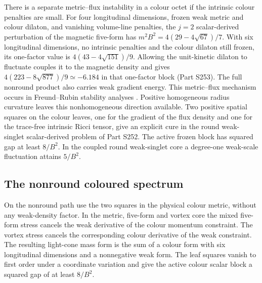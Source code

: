 \documentclass[aps,prd,reprint,onecolumn,nofootinbib,amsmath,amssymb]{revtex4-2}
\begin{document}
There is a separate metric--flux instability in a colour octet if the intrinsic colour penalties are small. For four longitudinal dimensions, frozen weak metric and colour dilaton, and vanishing volume-line penalties, the $j=2$ scalar-derived perturbation of the magnetic five-form has $m^2B^2=4(29-4\sqrt{67})/7$. With six longitudinal dimensions, no intrinsic penalties and the colour dilaton still frozen, its one-factor value is $4(43-4\sqrt{151})/9$. Allowing the unit-kinetic dilaton to fluctuate couples it to the magnetic density and gives $4(223-8\sqrt{877})/9\simeq-6.184$ in that one-factor block (Part S253). The full nonround product also carries weak gradient energy. This metric--flux mechanism occurs in Freund--Rubin stability analyses \cite{BoussoFlux,BrownFlux}. Positive homogeneous radius curvature leaves this nonhomogeneous direction available. Two positive spatial squares on the colour leaves, one for the gradient of the flux density and one for the trace-free intrinsic Ricci tensor, give an explicit cure in the round weak-singlet scalar-derived problem of Part S252. The active frozen block has squared gap at least $8/B^2$. In the coupled round weak-singlet core a degree-one weak-scale fluctuation attains $5/B^2$.

\subsection{The nonround coloured spectrum}

On the nonround path use the two squares in the physical colour metric, without any weak-density factor. In the metric, five-form and vortex core the mixed five-form stress cancels the weak derivative of the colour momentum constraint. The vortex stress cancels the corresponding colour derivative of the weak constraint. The resulting light-cone mass form is the sum of a colour form with six longitudinal dimensions and a nonnegative weak form. The leaf squares vanish to first order under a coordinate variation and give the active colour scalar block a squared gap of at least $8/B^2$.
\end{document}
